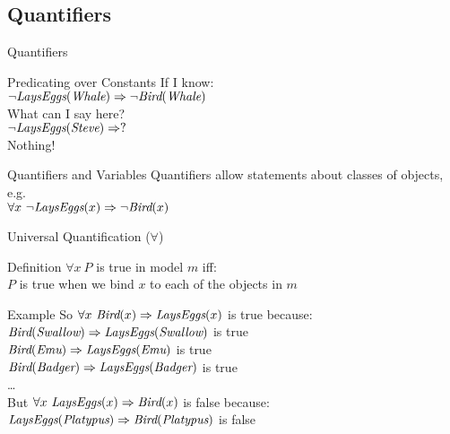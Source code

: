 \documentclass[12pt]{beamer}
\newcommand{\EM}[1]{\mbox{\em#1}}
\newcommand{\tab}{\hspace{1em}}
\newcommand{\limpl}{\Rightarrow}
\begin{document}
\subsection{Quantifiers}
\begin{frame}{Quantifiers}
	\begin{block}{Predicating over Constants}
		If I know: \\
		\tab$\lnot\EM{LaysEggs}(\EM{Whale}) \limpl \lnot\EM{Bird}(\EM{Whale})$ \\[.5em]
		What can I say here? \\
		\tab$\lnot\EM{LaysEggs}(\EM{Steve}) \limpl ?$ \\[.5em]
		\pause
		\alert{Nothing!}
	\end{block}
	\pause
	\begin{block}{Quantifiers and Variables}
		Quantifiers allow statements about classes of objects, e.g. \\
		\tab$\forall x\ \lnot\EM{LaysEggs}(x) \limpl \lnot\EM{Bird}(x)$
	\end{block}
\end{frame}
\begin{frame}{Universal Quantification ($\forall$)}
	\begin{block}{Definition}
		$\forall x\ P$ is true in model $m$ iff: \\
		\tab\tab$P$ is true when we bind $x$ to \alert{each} of the objects in $m$
	\end{block}
	\pause
	\begin{block}{Example}
		So $\forall x\ \EM{Bird}(x) \limpl \EM{LaysEggs}(x)$ is true because: \\
		\tab\tab$\EM{Bird}(\EM{Swallow}) \limpl \EM{LaysEggs}(\EM{Swallow})$ is true \\
		\tab\tab$\EM{Bird}(\EM{Emu}) \limpl \EM{LaysEggs}(\EM{Emu})$ is true \\
		\tab\tab$\EM{Bird}(\EM{Badger}) \limpl \EM{LaysEggs}(\EM{Badger})$ is true \\
		\tab\tab\ldots \\[.5em]
		\pause
		But $\forall x\ \EM{LaysEggs}(x) \limpl \EM{Bird}(x)$ is false because: \\
		\pause
		\tab\tab$\EM{LaysEggs}(\EM{Platypus}) \limpl \EM{Bird}(\EM{Platypus})$ is false
	\end{block}
\end{frame}
\end{document}
